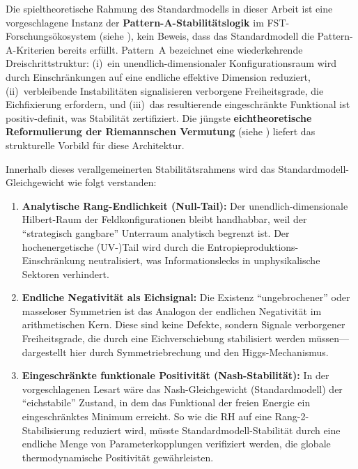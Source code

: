 \documentclass[12pt,a4paper]{article}
\theoremstyle{remark}
\begin{document}
Die spieltheoretische Rahmung des Standardmodells in dieser Arbeit ist eine vorgeschlagene Instanz der \textbf{Pattern-A-Stabilit\"atslogik} im FST-Forschungs\"okosystem (siehe \cite{FST-Unified2026}), kein Beweis, dass das Standardmodell die Pattern-A-Kriterien bereits erf\"ullt. Pattern~A bezeichnet eine wiederkehrende Dreischrittstruktur: (i)~ein unendlich-dimensionaler Konfigurationsraum wird durch Einschr\"ankungen auf eine endliche effektive Dimension reduziert, (ii)~verbleibende Instabilit\"aten signalisieren verborgene Freiheitsgrade, die Eichfixierung erfordern, und (iii)~das resultierende eingeschr\"ankte Funktional ist positiv-definit, was Stabilit\"at zertifiziert. Die j\"ungste \textbf{eichtheoretische Reformulierung der Riemannschen Vermutung} (siehe \cite{GeigerRH2026c}) liefert das strukturelle Vorbild f\"ur diese Architektur.

Innerhalb dieses verallgemeinerten Stabilit\"atsrahmens wird das Standardmodell-Gleichgewicht wie folgt verstanden:
\begin{enumerate}[label=\alph*)]
    \item \textbf{Analytische Rang-Endlichkeit (Null-Tail):} Der unendlich-dimensionale Hilbert-Raum der Feldkonfigurationen bleibt handhabbar, weil der ``strategisch gangbare'' Unterraum analytisch begrenzt ist. Der hochenergetische (UV-)Tail wird durch die Entropieproduktions-Einschr\"ankung neutralisiert, was Informationslecks in unphysikalische Sektoren verhindert.
    \item \textbf{Endliche Negativit\"at als Eichsignal:} Die Existenz ``ungebrochener'' oder masseloser Symmetrien ist das Analogon der endlichen Negativit\"at im arithmetischen Kern. Diese sind keine Defekte, sondern Signale verborgener Freiheitsgrade, die durch eine Eichverschiebung stabilisiert werden m\"ussen---dargestellt hier durch Symmetriebrechung und den Higgs-Mechanismus.
    \item \textbf{Eingeschr\"ankte funktionale Positivit\"at (Nash-Stabilit\"at):} In der vorgeschlagenen Lesart w\"are das Nash-Gleichgewicht (Standardmodell) der ``eichstabile'' Zustand, in dem das Funktional der freien Energie ein eingeschr\"anktes Minimum erreicht. So wie die RH auf eine Rang-2-Stabilisierung reduziert wird, m\"usste Standardmodell-Stabilit\"at durch eine endliche Menge von Parameterkopplungen verifiziert werden, die globale thermodynamische Positivit\"at gew\"ahrleisten.
\end{enumerate}
\end{document}
